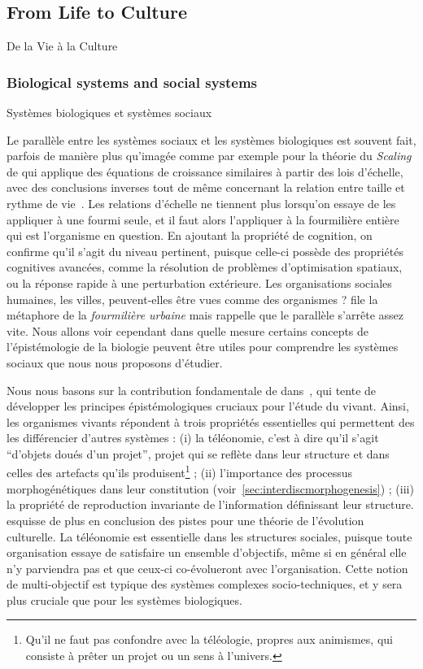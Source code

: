 \subsection{From Life to Culture}{De la Vie à la Culture}

\subsubsection{Biological systems and social systems}{Systèmes biologiques et systèmes sociaux}

Le parallèle entre les systèmes sociaux et les systèmes biologiques est souvent fait, parfois de manière plus qu'imagée comme par exemple pour la théorie du \emph{Scaling} de  qui applique des équations de croissance similaires à partir des lois d'échelle, avec des conclusions inverses tout de même concernant la relation entre taille et rythme de vie~\cite{bettencourt2007growth}. Les relations d'échelle ne tiennent plus lorsqu'on essaye de les appliquer à une fourmi seule, et il faut alors l'appliquer à la fourmilière entière qui est l'organisme en question. En ajoutant la propriété de cognition, on confirme qu'il s'agit du niveau pertinent, puisque celle-ci possède des propriétés cognitives avancées, comme la résolution de problèmes d'optimisation spatiaux, ou la réponse rapide à une perturbation extérieure. Les organisations sociales humaines, les villes, peuvent-elles être vues comme des organismes ? \cite{banos2013pour} file la métaphore de la \emph{fourmilière urbaine} mais rappelle que le parallèle s'arrête assez vite. Nous allons voir cependant dans quelle mesure certains concepts de l'épistémologie de la biologie peuvent être utiles pour comprendre les systèmes sociaux que nous nous proposons d'étudier.


Nous nous basons sur la contribution fondamentale de  dans~\cite{monod1970hasard}, qui tente de développer les principes épistémologiques cruciaux pour l'étude du vivant. Ainsi, les organismes vivants répondent à trois propriétés essentielles qui permettent des les différencier d'autres systèmes : (i) la téléonomie, c'est à dire qu'il s'agit ``d'objets doués d'un projet'', projet qui se reflète dans leur structure et dans celles des artefacts qu'ils produisent\footnote{Qu'il ne faut pas confondre avec la téléologie, propres aux animismes, qui consiste à prêter un projet ou un sens à l'univers.} ; (ii) l'importance des processus morphogénétiques dans leur constitution (voir~\ref{sec:interdiscmorphogenesis}) ; (iii) la propriété de reproduction invariante de l'information définissant leur structure.  esquisse de plus en conclusion des pistes pour une théorie de l'évolution culturelle. La téléonomie est essentielle dans les structures sociales, puisque toute organisation essaye de satisfaire un ensemble d'objectifs, même si en général elle n'y parviendra pas et que ceux-ci co-évolueront avec l'organisation. Cette notion de multi-objectif est typique des systèmes complexes socio-techniques, et y sera plus cruciale que pour les systèmes biologiques.

